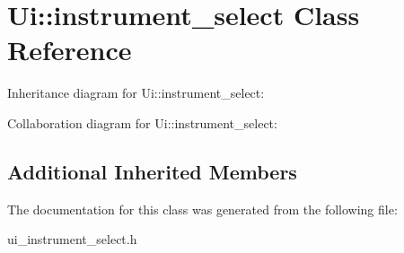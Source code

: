 \hypertarget{classUi_1_1instrument__select}{}\section{Ui\+:\+:instrument\+\_\+select Class Reference}
\label{classUi_1_1instrument__select}


Inheritance diagram for Ui\+:\+:instrument\+\_\+select\+:


Collaboration diagram for Ui\+:\+:instrument\+\_\+select\+:
\subsection*{Additional Inherited Members}


The documentation for this class was generated from the following file\+:\begin{DoxyCompactItemize}
\item 
ui\+\_\+instrument\+\_\+select.\+h\end{DoxyCompactItemize}
